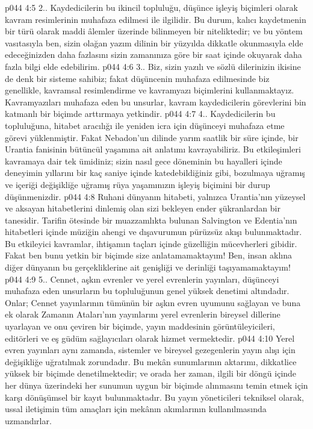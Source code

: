 \vs p044 4:5 2.\bibnobreakspace {}. Kaydedicilerin bu ikincil topluluğu, düşünce işleyiş biçimleri olarak kavram resimlerinin muhafaza edilmesi ile ilgilidir. Bu durum, kalıcı kaydetmenin bir türü olarak maddi âlemler üzerinde bilinmeyen bir niteliktedir; ve bu yöntem vasıtasıyla ben, sizin olağan yazım dilinin bir yüzyılda dikkatle okunmasıyla elde edeceğinizden daha fazlasını sizin zamanınıza göre bir saat içinde okuyarak daha fazla bilgi elde edebilirim.
\vs p044 4:6 3.\bibnobreakspace {}. Biz, sizin yazılı ve sözlü dilerinizin ikisine de denk bir sisteme sahibiz; fakat düşüncenin muhafaza edilmesinde biz genellikle, kavramsal resimlendirme ve kavramyazı biçimlerini kullanmaktayız. Kavramyazıları muhafaza eden bu unsurlar, kavram kaydedicilerin görevlerini bin katmanlı bir biçimde arttırmaya yetkindir.
\vs p044 4:7 4.\bibnobreakspace {}. Kaydedicilerin bu topluluğuna, hitabet aracılığı ile yeniden icra için düşünceyi muhafaza etme görevi yüklenmiştir. Fakat Nebadon’un dilinde yarım saatlik bir süre içinde, bir Urantia fanisinin bütüncül yaşamına ait anlatımı kavrayabiliriz. Bu etkileşimleri kavramaya dair tek ümidiniz; sizin nasıl gece döneminin bu hayalleri içinde deneyimin yıllarını bir kaç saniye içinde katedebildiğiniz gibi, bozulmaya uğramış ve içeriği değişikliğe uğramış rüya yaşamınızın işleyiş biçimini bir durup düşünmenizdir.
\vs p044 4:8 Ruhani dünyanın hitabeti, yalnızca Urantia’nın yüzeysel ve aksayan hitabetlerini dinlemiş olan sizi bekleyen ender şükranlardan bir tanesidir. Tarifin ötesinde bir muazzamlıkta bulunan Salvington ve Edentia’nın hitabetleri içinde müziğin ahengi ve dışavurumun pürüzsüz akışı bulunmaktadır. Bu etkileyici kavramlar, ihtişamın taçları içinde güzelliğin mücevherleri gibidir. Fakat ben bunu yetkin bir biçimde size anlatamamaktayım! Ben, insan aklına diğer dünyanın bu gerçekliklerine ait genişliği ve derinliği taşıyamamaktayım!
\vs p044 4:9 5.\bibnobreakspace {}. Cennet, aşkın evrenler ve yerel evrenlerin yayınları, düşünceyi muhafaza eden unsurların bu topluluğunun genel yüksek denetimi altındadır. Onlar; Cennet yayınlarının tümünün bir aşkın evren uyumunu sağlayan ve buna ek olarak Zamanın Ataları’nın yayınlarını yerel evrenlerin bireysel dillerine uyarlayan ve onu çeviren bir biçimde, yayın maddesinin görüntüleyicileri, editörleri ve eş güdüm sağlayıcıları olarak hizmet vermektedir.
\vs p044 4:10 Yerel evren yayınları aynı zamanda, sistemler ve bireysel gezegenlerin yayın alışı için değişikliğe uğratılmak zorundadır. Bu mekân sunumlarının aktarımı, dikkatlice yüksek bir biçimde denetilmektedir; ve orada her zaman, ilgili bir döngü içinde her dünya üzerindeki her sunumun uygun bir biçimde alınmasını temin etmek için karşı dönüşümsel bir kayıt bulunmaktadır. Bu yayın yöneticileri tekniksel olarak, ussal iletişimin tüm amaçları için mekânın akımlarının kullanılmasında uzmandırlar.
